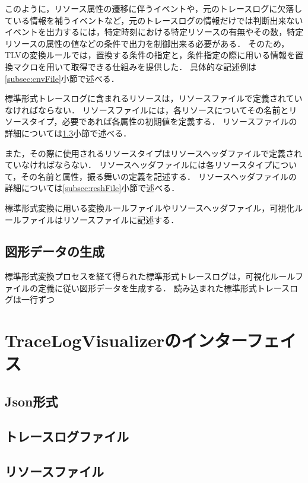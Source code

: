 このように，リソース属性の遷移に伴うイベントや，元のトレースログに欠落している情報を補うイベントなど，元のトレースログの情報だけでは判断出来ないイベントを出力するには，特定時刻における特定リソースの有無やその数，特定リソースの属性の値などの条件で出力を制御出来る必要がある．
そのため，TLVの変換ルールでは，置換する条件の指定と，条件指定の際に用いる情報を置換マクロを用いて取得できる仕組みを提供した．
具体的な記述例は\ref{subsec:cnvFile}小節で述べる．

標準形式トレースログに含まれるリソースは，リソースファイルで定義されていなければならない．
リソースファイルには，各リソースについてその名前とリソースタイプ，必要であれば各属性の初期値を定義する．
リソースファイルの詳細については\ref{subsec:resFile}小節で述べる．

また，その際に使用されるリソースタイプはリソースヘッダファイルで定義されていなければならない．
リソースヘッダファイルには各リソースタイプについて，その名前と属性，振る舞いの定義を記述する．
リソースヘッダファイルの詳細については\ref{subsec:reshFile}小節で述べる．

標準形式変換に用いる変換ルールファイルやリソースヘッダファイル，可視化ルールファイルはリソースファイルに記述する．

\subsection{図形データの生成}

標準形式変換プロセスを経て得られた標準形式トレースログは，可視化ルールファイルの定義に従い図形データを生成する．
読み込まれた標準形式トレースログは一行ずつ



\section{TraceLogVisualizerのインターフェイス}

\subsection{Json形式}

\subsection{トレースログファイル}

\subsection{リソースファイル}
\label{subsec:resFile}

